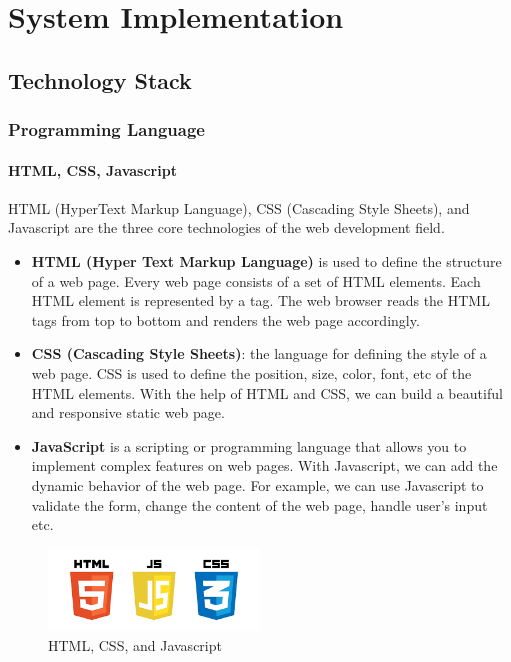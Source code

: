 \chapter{System Implementation}


\section{Technology Stack}

\subsection{Programming Language}
\subsubsection{HTML, CSS, Javascript}
HTML (HyperText Markup Language), CSS (Cascading Style Sheets), and Javascript are the three core technologies of the web development field. 
\begin{itemize}

    \item \textbf{HTML (Hyper Text Markup Language)} is used to define the structure of a web page. Every web page consists of a set of HTML elements. Each HTML element is represented by a tag. The web browser reads the HTML tags from top to bottom and renders the web page accordingly.

    \item \textbf{CSS (Cascading Style Sheets)}: the language for defining the style of a web page. CSS is used to define the position, size, color, font, etc of the HTML elements. With the help of HTML and CSS, we can build a beautiful and responsive static web page. 

    \item \textbf{JavaScript} is a scripting or programming language that allows you to implement complex features on web pages. With Javascript, we can add the dynamic behavior of the web page. For example, we can use Javascript to validate the form, change the content of the web page, handle user's input etc.
\end{itemize}

\begin{figure}[ht]
    \centering
    \includegraphics[width=0.5\textwidth]{../Images/8.Technology_Stack/html_css_js.png}
    \caption{HTML, CSS, and Javascript}
    \label{fig:html_css_javascript}
\end{figure}

